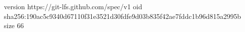 version https://git-lfs.github.com/spec/v1
oid sha256:190ac5c9340d67110f31e3521d30fdfe9d03b835f42ae7fddc1b96d815a2995b
size 66
